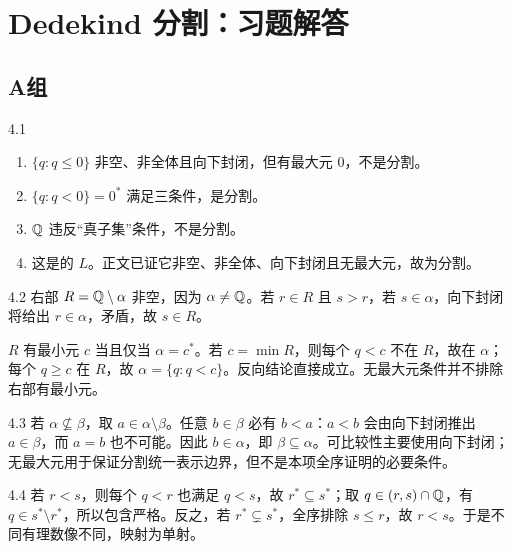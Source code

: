 \chapter{Dedekind 分割：习题解答}

\section*{A组}

\begin{solution}{4.1}
\begin{enumerate}[label=(\arabic*)]
 \item \(\{q:q\le0\}\) 非空、非全体且向下封闭，但有最大元 \(0\)，不是分割。
 \item \(\{q:q<0\}=0^*\) 满足三条件，是分割。
 \item \(\mathbb{Q}\) 违反“真子集”条件，不是分割。
 \item 这是的 \(L\)。正文已证它非空、非全体、向下封闭且无最大元，故为分割。
\end{enumerate}
\end{solution}

\begin{solution}{4.2}
右部 \(R=\mathbb{Q}\setminus\alpha\) 非空，因为 \(\alpha\ne\mathbb{Q}\)。若 \(r\in R\) 且 \(s>r\)，若 \(s\in\alpha\)，向下封闭将给出 \(r\in\alpha\)，矛盾，故 \(s\in R\)。

\(R\) 有最小元 \(c\) 当且仅当 \(\alpha=c^*\)。若 \(c=\min R\)，则每个 \(q<c\) 不在 \(R\)，故在 \(\alpha\)；每个 \(q\ge c\) 在 \(R\)，故 \(\alpha=\{q:q<c\}\)。反向结论直接成立。无最大元条件并不排除右部有最小元。
\end{solution}

\begin{solution}{4.3}
若 \(\alpha\nsubseteq\beta\)，取 \(a\in\alpha\setminus\beta\)。任意 \(b\in\beta\) 必有 \(b<a\)：\(a<b\) 会由向下封闭推出 \(a\in\beta\)，而 \(a=b\) 也不可能。因此 \(b\in\alpha\)，即 \(\beta\subseteq\alpha\)。可比较性主要使用向下封闭；无最大元用于保证分割统一表示边界，但不是本项全序证明的必要条件。
\end{solution}

\begin{solution}{4.4}
若 \(r<s\)，则每个 \(q<r\) 也满足 \(q<s\)，故 \(r^*\subseteq s^*\)；取 \(q\in(r,s)\cap\mathbb{Q}\)，有 \(q\in s^*\setminus r^*\)，所以包含严格。反之，若 \(r^*\subsetneq s^*\)，全序排除 \(s\le r\)，故 \(r<s\)。于是不同有理数像不同，映射为单射。
\end{solution}

